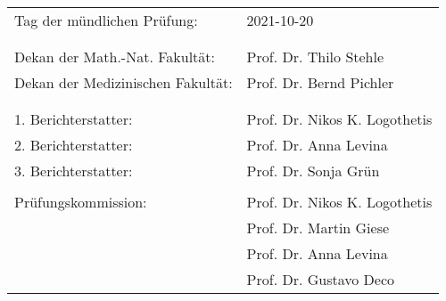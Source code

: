 \vspace*{\fill}



\begin{table}[h!]
{\begin{tabular}{ll}

Tag der m\"undlichen Pr\"ufung: & 2021-10-20 \\
&  \\
&  \\
Dekan der Math.-Nat. Fakult\"at: & Prof. Dr. Thilo Stehle \\
Dekan der Medizinischen Fakult\"at: & Prof. Dr. Bernd Pichler  \\
&  \\
&  \\
1. Berichterstatter:  & Prof. Dr. Nikos K. Logothetis  \\
2. Berichterstatter:  & Prof. Dr. Anna Levina  \\
3. Berichterstatter:  & Prof. Dr. Sonja Gr\"un   \\
&  \\
   Pr\"ufungskommission:  & Prof. Dr. Nikos K. Logothetis  \\
  & Prof. Dr. Martin Giese \\
  & Prof. Dr. Anna Levina \\
  & Prof. Dr. Gustavo Deco \\

\end{tabular}}{}

\end{table}



